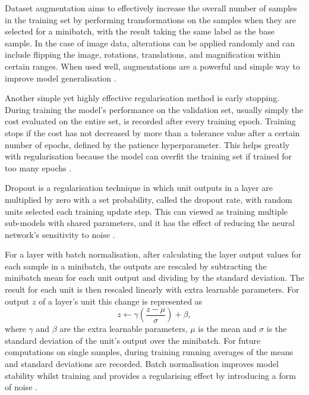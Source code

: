\documentclass[12pt]{article}
\begin{document}
Dataset augmentation aims to effectively increase the overall number of samples in the training set by performing transformations on the samples when they are selected for a minibatch, with the result taking the same label as the base sample. In the case of image data, alterations can be applied randomly and can include flipping the image, rotations, translations, and magnification within certain ranges. When used well, augmentations are a powerful and simple way to improve model generalisation \cite{Goodfellow16}.

Another simple yet highly effective regularisation method is early stopping. During training the model's performance on the validation set, usually simply the cost evaluated on the entire set, is recorded after every training epoch. Training stops if the cost has not decreased by more than a tolerance value after a certain number of epochs, defined by the patience hyperparameter. This helps greatly with regularisation because the model can overfit the training set if trained for too many epochs \cite{Goodfellow16, Bishop95}.

Dropout is a regularisation technique in which unit outputs in a layer are multiplied by zero with a set probability, called the dropout rate, with random units selected each training update step. This can viewed as training multiple sub-models with shared parameters, and it has the effect of reducing the neural network's sensitivity to noise \cite{Srivastava2014}.

For a layer with batch normalisation, after calculating the layer output values for each sample in a minibatch, the outputs are rescaled by subtracting the minibatch mean for each unit output and dividing by the standard deviation. The result for each unit is then rescaled linearly with extra learnable parameters. For output $z$ of a layer's unit this change is represented as
\begin{equation}
z\leftarrow\gamma\left(\frac{z-\mu}{\sigma}\right)+\beta, \label{batchnorm}
\end{equation}
where $\gamma$ and $\beta$ are the extra learnable parameters, $\mu$ is the mean and $\sigma$ is the standard deviation of the unit's output over the minibatch. For future computations on single samples, during training running averages of the means and standard deviations are recorded. Batch normalisation improves model stability whilst training and provides a regularising effect by introducing a form of noise \cite{Ioffe15}.

\end{document}
